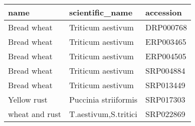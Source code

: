 \begin{tabular}{lll}
\toprule
 name                          & scientific\_name                                         & accession                                                                       \\
\midrule
 Bread wheat                 & Triticum aestivum                                     & DRP000768                                          \\ 
 Bread wheat                 & Triticum aestivum                                     & ERP003465                                          \\ 
 Bread wheat                 & Triticum aestivum                                     & ERP004505                                          \\ 
 Bread wheat                 & Triticum aestivum                                     & SRP004884                                          \\ 
 Bread wheat                 & Triticum aestivum                                     & SRP013449                                          \\ 
 Yellow rust                 & Puccinia striiformis            & SRP017303                                          \\ 
 wheat and rust & T.aestivum,S.tritici & SRP022869                                          \\ 
\bottomrule
\end{tabular}
